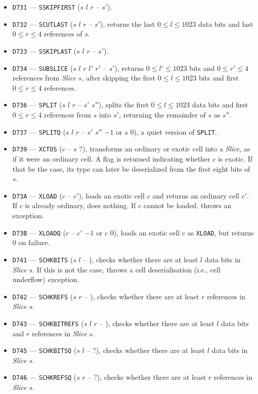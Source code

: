 \documentclass[12pt,oneside]{article}
\begin{document}
\begin{itemize}
\item {\tt D731} --- {\tt SSKIPFIRST} ($s$ $l$ $r$ -- $s'$).
\item {\tt D732} --- {\tt SCUTLAST} ($s$ $l$ $r$ -- $s'$), returns the last $0\leq l\leq 1023$ data bits and last $0\leq r\leq 4$ references of $s$.
\item {\tt D733} --- {\tt SSKIPLAST} ($s$ $l$ $r$ -- $s'$).
\item {\tt D734} --- {\tt SUBSLICE} ($s$ $l$ $r$ $l'$ $r'$ -- $s'$), returns $0\leq l'\leq 1023$ bits and $0\leq r'\leq 4$ references from {\em Slice\/} $s$, after skipping the first $0\leq l\leq 1023$ bits and first $0\leq r\leq 4$ references.
\item {\tt D736} --- {\tt SPLIT} ($s$ $l$ $r$ -- $s'$ $s''$), splits the first $0\leq l\leq 1023$ data bits and first $0\leq r\leq 4$ references from $s$ into $s'$, returning the remainder of $s$ as $s''$.
\item {\tt D737} --- {\tt SPLITQ} ($s$ $l$ $r$ -- $s'$ $s''$ $-1$ or $s$ $0$), a quiet version of {\tt SPLIT}.
\item {\tt D739} --- {\tt XCTOS} ($c$ -- $s$ $?$), transforms an ordinary or exotic cell into a {\em Slice}, as if it were an ordinary cell. A flag is returned indicating whether $c$ is exotic. If that be the case, its type can later be deserialized from the first eight bits of~$s$.
\item {\tt D73A} --- {\tt XLOAD} ($c$ -- $c'$), loads an exotic cell $c$ and returns an ordinary cell $c'$. If $c$ is already ordinary, does nothing. If $c$ cannot be loaded, throws an exception.
\item {\tt D73B} --- {\tt XLOADQ} ($c$ -- $c'$ $-1$ or $c$ $0$), loads an exotic cell $c$ as {\tt XLOAD}, but returns 0 on failure.
\item {\tt D741} --- {\tt SCHKBITS} ($s$ $l$ -- ), checks whether there are at least $l$ data bits in {\em Slice\/} $s$. If this is not the case, throws a cell deserialisation (i.e., cell underflow) exception.
\item {\tt D742} --- {\tt SCHKREFS} ($s$ $r$ -- ), checks whether there are at least $r$ references in {\em Slice\/} $s$.
\item {\tt D743} --- {\tt SCHKBITREFS} ($s$ $l$ $r$ -- ), checks whether there are at least $l$ data bits and $r$ references in {\em Slice\/} $s$.
\item {\tt D745} --- {\tt SCHKBITSQ} ($s$ $l$ -- $?$), checks whether there are at least $l$ data bits in {\em Slice\/} $s$.
\item {\tt D746} --- {\tt SCHKREFSQ} ($s$ $r$ -- $?$), checks whether there are at least $r$ references in {\em Slice\/} $s$.

\end{itemize}
\end{document}
